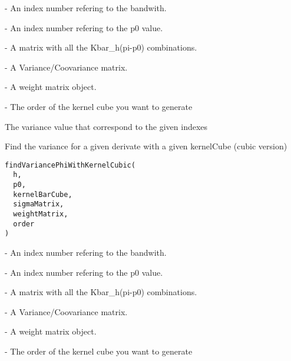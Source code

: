 \documentclass[letterpaper]{book}
\begin{document}
%
\begin{Arguments}
\begin{ldescription}
\item[\code{h}] - An index number refering to the bandwith.

\item[\code{p0}] - An index number refering to the p0 value.

\item[\code{kernelBarCube}] - A matrix with all the Kbar\_h(pi-p0) combinations.

\item[\code{sigmaMatrix}] - A Variance/Coovariance matrix.

\item[\code{weightMatrix}] - A weight matrix object.

\item[\code{order}] - The order of the kernel cube you want to generate
\end{ldescription}
\end{Arguments}
%
\begin{Value}
The variance value that correspond to the given indexes
\end{Value}
%
\begin{Description}\relax
Find the variance for a given derivate with a given kernelCube (cubic version)
\end{Description}
%
\begin{Usage}
\begin{verbatim}
findVariancePhiWithKernelCubic(
  h,
  p0,
  kernelBarCube,
  sigmaMatrix,
  weightMatrix,
  order
)
\end{verbatim}
\end{Usage}
%
\begin{Arguments}
\begin{ldescription}
\item[\code{h}] - An index number refering to the bandwith.

\item[\code{p0}] - An index number refering to the p0 value.

\item[\code{kernelBarCube}] - A matrix with all the Kbar\_h(pi-p0) combinations.

\item[\code{sigmaMatrix}] - A Variance/Coovariance matrix.

\item[\code{weightMatrix}] - A weight matrix object.

\item[\code{order}] - The order of the kernel cube you want to generate
\end{ldescription}
\end{Arguments}
\end{document}
